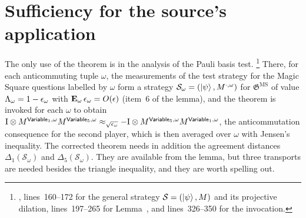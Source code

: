 \documentclass[11pt]{article}
\newcommand{\game}{\mathfrak{G}}
\newcommand{\strategy}{\mathcal{S}}
\newcommand{\MS}{\mathrm{MS}}
\newcommand{\Id}{\mathrm{I}}
\newcommand{\Variable}{\mathsf{Variable}}
\begin{document}
\section{Sufficiency for the source's application}
\label{sec:sufficiency}

The only use of the theorem is in the analysis of the Pauli basis test.%
\footnote{,
lines~160--172 for the general strategy $\strategy = (\ket\psi, M)$ and its
projective dilation, lines~197--265 for Lemma~, and
lines~326--350 for the invocation.}
There, for each anticommuting tuple $\omega$, the measurements of the test
strategy for the Magic Square questions labelled by $\omega$ form a strategy
$\strategy_\omega = (\ket\psi, M^{\cdot,\omega})$ for $\game^{\MS}$ of value
$\Lambda_\omega = 1 - \epsilon_\omega$ with $\mathop{\bf E\/}_\omega \epsilon_\omega = O(\epsilon)$
(item~6 of the lemma), and the theorem is invoked for each $\omega$ to obtain
$\Id \ot M^{\Variable_1,\omega} M^{\Variable_5,\omega}
\approx_{\sqrt{\eps_\omega}} -\Id \ot M^{\Variable_5,\omega} M^{\Variable_1,\omega}$,
the anticommutation consequence for the second player, which is then
averaged over $\omega$ with Jensen's inequality.  The corrected theorem needs
in addition the agreement distances $\Delta_1(\strategy_\omega)$ and
$\Delta_5(\strategy_\omega)$.
They are available from the lemma, but three transports are needed besides the
triangle inequality, and they are worth spelling out.
\end{document}
